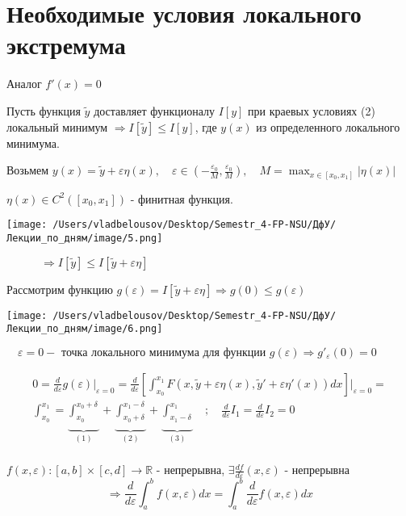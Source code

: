 \documentclass[12pt, a4paper]{report}
\begin{document}
\section{Необходимые условия локального экстремума}

Аналог \( f'(x) = 0  \) 

Пусть функция \(\tilde{y}   \) доставляет функционалу \( I[y] \) при краевых условиях (2) локальный минимум \( \Rightarrow I[\tilde{y} ] \le I[y]  \), где \( y(x) \) из определенного локального минимума.

Возьмем \( \displaystyle y(x)=\tilde{y} + \varepsilon \eta(x) , \quad \varepsilon \in \left( -\frac{\varepsilon_0}{M}, \frac{\varepsilon_0}{M}   \right), \quad  M= \max _{x \in  [x_0,x_1]} |\eta (x) |  \)

\( \eta (x) \in  C ^2 ([x_0,x_1])  \) - финитная функция. 

\begin{minipage}{0.4\textwidth}
    \texttt{[image: /Users/vladbelousov/Desktop/Semestr\_4-FP-NSU/ДфУ/Лекции\_по\_дням/image/5.png]}
\end{minipage}
\begin{minipage}{1\textwidth}
    \( \quad \quad \quad  \Rightarrow I[\tilde{y} ] \le I[\tilde{y} + \varepsilon \eta ]  \) 
\end{minipage}

Рассмотрим функцию \( g(\varepsilon)= I[\tilde{y}+ \varepsilon \eta  ] \Rightarrow g(0) \le g(\varepsilon) \) 

\begin{minipage}{0.25\textwidth}
    \texttt{[image: /Users/vladbelousov/Desktop/Semestr\_4-FP-NSU/ДфУ/Лекции\_по\_дням/image/6.png]}
\end{minipage}
\begin{minipage}{1\textwidth}
    \( \quad \varepsilon= 0 - \text{ точка локального минимума для функции } g(\varepsilon) \Rightarrow g'_{\varepsilon}(0)=0     \) 
\end{minipage}

\begin{gather*}
    0 = \frac{d}{d \varepsilon}g (\varepsilon) |_{\varepsilon=0}= \frac{d}{d \varepsilon} \left[ \int_{x_0}^{x_1} F(x,\tilde{y}+ \varepsilon\eta  (x) , \tilde{y}'+\varepsilon\eta ' (x) ) dx \right] \bigg |_{\varepsilon=0} \boxed{=}   \\
    \int_{x_0}^{x_1}= \underbrace{\int_{x_0}^{x_0+\delta} }_{(1)} +   \underbrace{\int_{x_0 +\delta}^{x_1-\delta} }_{(2)}  +\underbrace{\int_{x_1 -\delta}^{x_1} }_{(3)} \quad ; \quad \frac{d}{d \varepsilon} I_1= \frac{d}{d \varepsilon} I_2=0 \\   
\end{gather*}
\begin{theorem}
    \( f(x, \varepsilon): [a,b] \times [c,d] \to \mathbb{R}  \) - непрерывна, \( \displaystyle \exists  \frac{df}{d \varepsilon} (x, \varepsilon)   \)  - непрерывна
    \[ \Rightarrow \frac{d}{d \varepsilon} \int_{a}^{b} f(x, \varepsilon)dx= \int_{a }^{b } \frac{d}{d \varepsilon } f(x, \varepsilon)dx     \]  
\end{theorem}  
\end{document}
